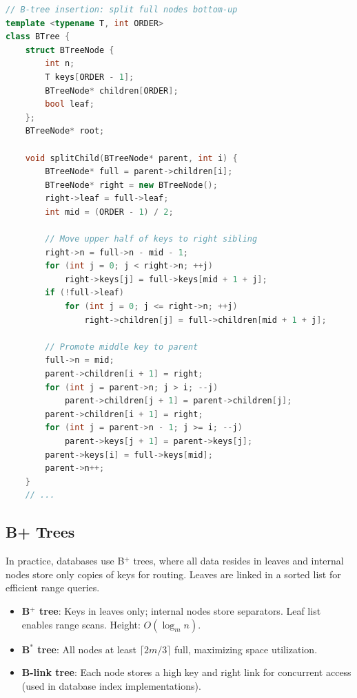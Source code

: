 \begin{lstlisting}[language=C++]
// B-tree insertion: split full nodes bottom-up
template <typename T, int ORDER>
class BTree {
    struct BTreeNode {
        int n;
        T keys[ORDER - 1];
        BTreeNode* children[ORDER];
        bool leaf;
    };
    BTreeNode* root;

    void splitChild(BTreeNode* parent, int i) {
        BTreeNode* full = parent->children[i];
        BTreeNode* right = new BTreeNode();
        right->leaf = full->leaf;
        int mid = (ORDER - 1) / 2;

        // Move upper half of keys to right sibling
        right->n = full->n - mid - 1;
        for (int j = 0; j < right->n; ++j)
            right->keys[j] = full->keys[mid + 1 + j];
        if (!full->leaf)
            for (int j = 0; j <= right->n; ++j)
                right->children[j] = full->children[mid + 1 + j];

        // Promote middle key to parent
        full->n = mid;
        parent->children[i + 1] = right;
        for (int j = parent->n; j > i; --j)
            parent->children[j + 1] = parent->children[j];
        parent->children[i + 1] = right;
        for (int j = parent->n - 1; j >= i; --j)
            parent->keys[j + 1] = parent->keys[j];
        parent->keys[i] = full->keys[mid];
        parent->n++;
    }
    // ...
\end{lstlisting}

\subsection{B+ Trees}
\label{sec:bplus-tree}

In practice, databases use B$^+$ trees, where all data resides in leaves and internal nodes store only copies of keys for routing. Leaves are linked in a sorted list for efficient range queries.

\begin{itemize}
    \item \textbf{B$^+$ tree}: Keys in leaves only; internal nodes store separators. Leaf list enables range scans. Height: $O(\log_m n)$.
    \item \textbf{B$^*$ tree}: All nodes at least $\lceil 2m/3 \rceil$ full, maximizing space utilization.
    \item \textbf{B-link tree}: Each node stores a high key and right link for concurrent access (used in database index implementations).
\end{itemize}

